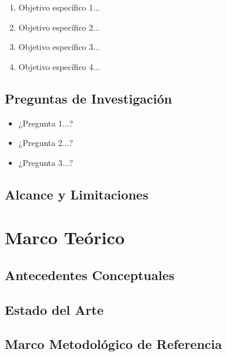 \documentclass[11pt,letterpaper]{article}
\begin{document}
\begin{enumerate}
    \item Objetivo específico 1...
    \item Objetivo específico 2...
    \item Objetivo específico 3...
    \item Objetivo específico 4...
\end{enumerate}

\subsection{Preguntas de Investigación}

\begin{itemize}
    \item ¿Pregunta 1...?
    \item ¿Pregunta 2...?
    \item ¿Pregunta 3...?
\end{itemize}

\subsection{Alcance y Limitaciones}



\section{Marco Teórico}

\subsection{Antecedentes Conceptuales}


\subsection{Estado del Arte}


\subsection{Marco Metodológico de Referencia}
\end{document}
